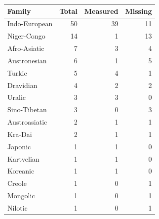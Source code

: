 \begin{tabular}{lrrr}\toprule Family & Total & Measured & Missing\\ \midrule
Indo-European & 50 & 39 & 11\\
Niger-Congo & 14 & 1 & 13\\
Afro-Asiatic & 7 & 3 & 4\\
Austronesian & 6 & 1 & 5\\
Turkic & 5 & 4 & 1\\
Dravidian & 4 & 2 & 2\\
Uralic & 3 & 3 & 0\\
Sino-Tibetan & 3 & 0 & 3\\
Austroasiatic & 2 & 1 & 1\\
Kra-Dai & 2 & 1 & 1\\
Japonic & 1 & 1 & 0\\
Kartvelian & 1 & 1 & 0\\
Koreanic & 1 & 1 & 0\\
Creole & 1 & 0 & 1\\
Mongolic & 1 & 0 & 1\\
Nilotic & 1 & 0 & 1\\
\bottomrule\end{tabular}
